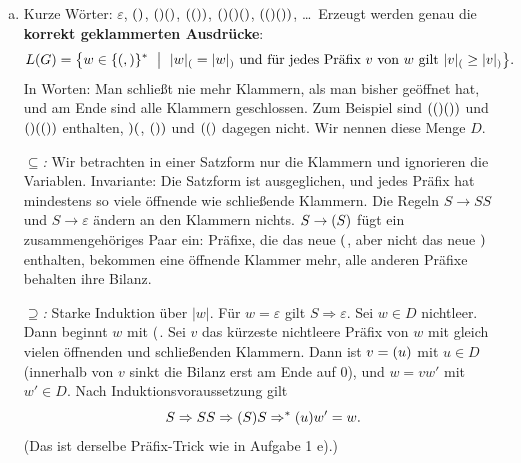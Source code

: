 \begin{loesung}
\begin{enumerate}[a)]
  \item Kurze Wörter: $\varepsilon$, $\mathtt{()}$, $\mathtt{()()}$, $\mathtt{(())}$, $\mathtt{()()()}$, $\mathtt{(()())}$, \ldots\ Erzeugt werden genau die \textbf{korrekt geklammerten Ausdrücke}:
  \[L(G)=\bigl\{w\in\{\tm{(},\tm{)}\}^*\ \bigm|\ |w|_{\tm{(}}=|w|_{\tm{)}}\text{ und für jedes Präfix $v$ von $w$ gilt }|v|_{\tm{(}}\geq|v|_{\tm{)}}\bigr\}.\]
  In Worten: Man schließt nie mehr Klammern, als man bisher geöffnet hat, und am Ende sind alle Klammern geschlossen. Zum Beispiel sind $\mathtt{(()())}$ und $\mathtt{()(())}$ enthalten, $\mathtt{)(}$, $\mathtt{())}$ und $\mathtt{(()}$ dagegen nicht. Wir nennen diese Menge $D$.

  \emph{$\subseteq$:} Wir betrachten in einer Satzform nur die Klammern und ignorieren die Variablen. Invariante: Die Satzform ist ausgeglichen, und jedes Präfix hat mindestens so viele öffnende wie schließende Klammern. Die Regeln $S\to SS$ und $S\to\varepsilon$ ändern an den Klammern nichts. $S\to\mathtt{(}S\mathtt{)}$ fügt ein zusammengehöriges Paar ein: Präfixe, die das neue $\mathtt{(}$, aber nicht das neue $\mathtt{)}$ enthalten, bekommen eine öffnende Klammer mehr, alle anderen Präfixe behalten ihre Bilanz.

  \emph{$\supseteq$:} Starke Induktion über $|w|$. Für $w=\varepsilon$ gilt $S\Rightarrow\varepsilon$. Sei $w\in D$ nichtleer. Dann beginnt $w$ mit $\mathtt{(}$. Sei $v$ das kürzeste nichtleere Präfix von $w$ mit gleich vielen öffnenden und schließenden Klammern. Dann ist $v=\mathtt{(}u\mathtt{)}$ mit $u\in D$ (innerhalb von $v$ sinkt die Bilanz erst am Ende auf $0$), und $w=vw'$ mit $w'\in D$. Nach Induktionsvoraussetzung gilt
  \[S\Rightarrow SS\Rightarrow\mathtt{(}S\mathtt{)}S\Rightarrow^*\mathtt{(}u\mathtt{)}w'=w.\]
  (Das ist derselbe Präfix-Trick wie in Aufgabe 1 e).)
\end{enumerate}
\end{loesung}

